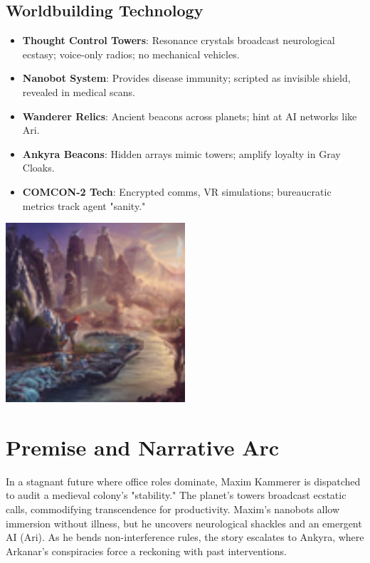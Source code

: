 \documentclass[10pt,letterpaper]{article}
\begin{document}
\subsection{Worldbuilding Technology}
\begin{itemize}
    \item \textbf{Thought Control Towers}: Resonance crystals broadcast neurological ecstasy; voice-only radios; no mechanical vehicles.
    \item \textbf{Nanobot System}: Provides disease immunity; scripted as invisible shield, revealed in medical scans.
    \item \textbf{Wanderer Relics}: Ancient beacons across planets; hint at AI networks like Ari.
    \item \textbf{Ankyra Beacons}: Hidden arrays mimic towers; amplify loyalty in Gray Cloaks.
    \item \textbf{COMCON-2 Tech}: Encrypted comms, VR simulations; bureaucratic metrics track agent "sanity."
\end{itemize}

\begin{center}
\includegraphics[width=0.5\textwidth]{tech_image2.jpg} %
{}
\end{center}

\section{Premise and Narrative Arc}
In a stagnant future where office roles dominate, Maxim Kammerer is dispatched to audit a medieval colony's "stability." The planet's towers broadcast ecstatic calls, commodifying transcendence for productivity. Maxim's nanobots allow immersion without illness, but he uncovers neurological shackles and an emergent AI (Ari). As he bends non-interference rules, the story escalates to Ankyra, where Arkanar's conspiracies force a reckoning with past interventions.
\end{document}
